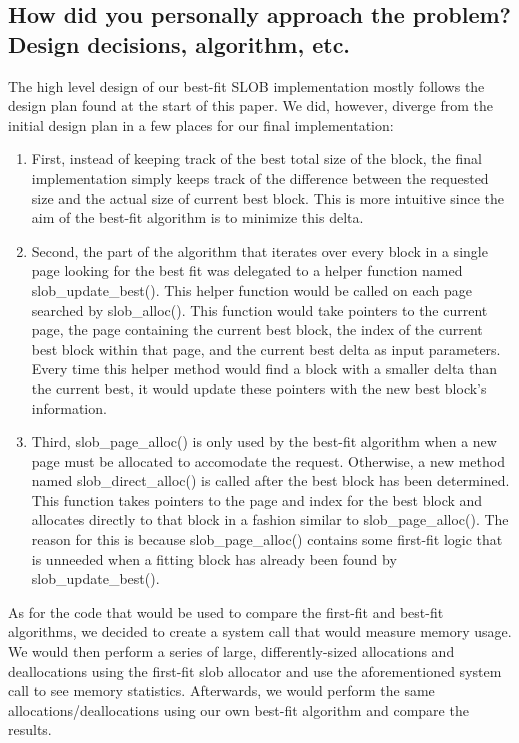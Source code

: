 \documentclass[letterpaper,10pt,titlepage,draftclsnofoot,onecolumn]{article}
\begin{document}
\subsection{How did you personally approach the problem? Design decisions, algorithm, etc.}
The high level design of our best-fit SLOB implementation mostly follows the design plan found at the start of this paper. We did, however, diverge from the initial design plan in a few places for our final implementation:
\begin{enumerate}
\item First, instead of keeping track of the best total size of the block, the final implementation simply keeps track of the difference between the requested size and the actual size of current best block. This is more intuitive since the aim of the best-fit algorithm is to minimize this delta.
\item Second, the part of the algorithm that iterates over every block in a single page looking for the best fit was delegated to a helper function named slob\_update\_best(). This helper function would be called on each page searched by slob\_alloc(). This function would take pointers to the current page, the page containing the current best block, the index of the current best block within that page, and the current best delta as input parameters. Every time this helper method would find a block with a smaller delta than the current best, it would update these pointers with the new best block's information.
\item Third, slob\_page\_alloc() is only used by the best-fit algorithm when a new page must be allocated to accomodate the request. Otherwise, a new method named slob\_direct\_alloc() is called after the best block has been determined. This function takes pointers to the page and index for the best block and allocates directly to that block in a fashion similar to slob\_page\_alloc(). The reason for this is because slob\_page\_alloc() contains some first-fit logic that is unneeded when a fitting block has already been found by slob\_update\_best().
\end{enumerate}
As for the code that would be used to compare the first-fit and best-fit algorithms, we decided to create a system call that would measure memory usage. We would then perform a series of large, differently-sized allocations and deallocations using the first-fit slob allocator and use the aforementioned system call to see memory statistics. Afterwards, we would perform the same allocations/deallocations using our own best-fit algorithm and compare the results. 
\end{document}
